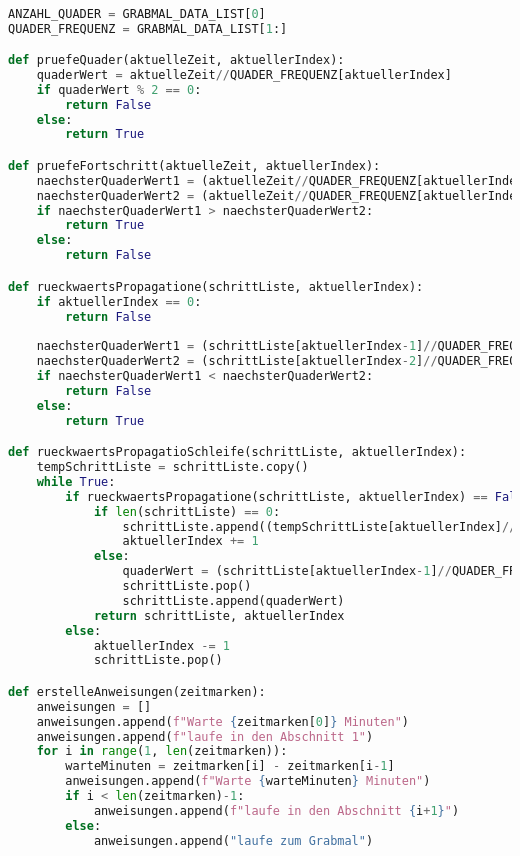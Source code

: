 \documentclass[a4paper,10pt,english]{scrartcl}
\begin{document}
\begin{lstlisting}[language=Python, 
                   basicstyle=\ttfamily,
                   breaklines=true,
                   showstringspaces=false,
                   commentstyle=\color{gray},
                   keywordstyle=\color{black},
                   stringstyle=\color{black},
                   emphstyle=\color{black}]

ANZAHL_QUADER = GRABMAL_DATA_LIST[0]
QUADER_FREQUENZ = GRABMAL_DATA_LIST[1:]

def pruefeQuader(aktuelleZeit, aktuellerIndex):
    quaderWert = aktuelleZeit//QUADER_FREQUENZ[aktuellerIndex]
    if quaderWert % 2 == 0:
        return False
    else:
        return True

def pruefeFortschritt(aktuelleZeit, aktuellerIndex):
    naechsterQuaderWert1 = (aktuelleZeit//QUADER_FREQUENZ[aktuellerIndex-1]+1)*QUADER_FREQUENZ[aktuellerIndex-1]
    naechsterQuaderWert2 = (aktuelleZeit//QUADER_FREQUENZ[aktuellerIndex]+1)*QUADER_FREQUENZ[aktuellerIndex]
    if naechsterQuaderWert1 > naechsterQuaderWert2:
        return True
    else:
        return False

def rueckwaertsPropagatione(schrittListe, aktuellerIndex):
    if aktuellerIndex == 0:
        return False
    
    naechsterQuaderWert1 = (schrittListe[aktuellerIndex-1]//QUADER_FREQUENZ[aktuellerIndex-1]+2)*QUADER_FREQUENZ[aktuellerIndex-1]
    naechsterQuaderWert2 = (schrittListe[aktuellerIndex-2]//QUADER_FREQUENZ[aktuellerIndex-2]+1)*QUADER_FREQUENZ[aktuellerIndex-2]
    if naechsterQuaderWert1 < naechsterQuaderWert2:
        return False
    else:
        return True

def rueckwaertsPropagatioSchleife(schrittListe, aktuellerIndex):
    tempSchrittListe = schrittListe.copy()
    while True:
        if rueckwaertsPropagatione(schrittListe, aktuellerIndex) == False:
            if len(schrittListe) == 0:
                schrittListe.append((tempSchrittListe[aktuellerIndex]//QUADER_FREQUENZ[aktuellerIndex]+2)*QUADER_FREQUENZ[aktuellerIndex])
                aktuellerIndex += 1
            else:
                quaderWert = (schrittListe[aktuellerIndex-1]//QUADER_FREQUENZ[aktuellerIndex-1]+2)*QUADER_FREQUENZ[aktuellerIndex-1]
                schrittListe.pop()
                schrittListe.append(quaderWert)
            return schrittListe, aktuellerIndex
        else:
            aktuellerIndex -= 1
            schrittListe.pop()

def erstelleAnweisungen(zeitmarken):
    anweisungen = []
    anweisungen.append(f"Warte {zeitmarken[0]} Minuten")
    anweisungen.append(f"laufe in den Abschnitt 1")
    for i in range(1, len(zeitmarken)):
        warteMinuten = zeitmarken[i] - zeitmarken[i-1]
        anweisungen.append(f"Warte {warteMinuten} Minuten")
        if i < len(zeitmarken)-1:
            anweisungen.append(f"laufe in den Abschnitt {i+1}")
        else:
            anweisungen.append("laufe zum Grabmal")
    

\end{lstlisting}
\end{document}

